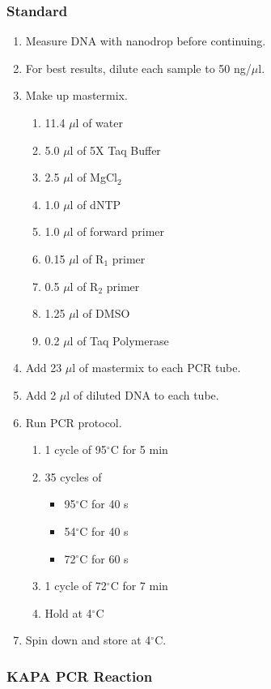 \subsubsection*{Standard}
\begin{enumerate}
\item Measure DNA with nanodrop before continuing\footnotemark.
\item For best results, dilute each sample to 50 ng/$\mu$l.
\item Make up mastermix.
  \begin{enumerate}
  \item 11.4 $\mu$l of water
  \item 5.0 $\mu$l of 5X Taq Buffer
  \item 2.5 $\mu$l of MgCl$_2$
  \item 1.0 $\mu$l of dNTP
  \item 1.0 $\mu$l of forward primer
  \item 0.15 $\mu$l of R$_1$ primer
  \item 0.5 $\mu$l of R$_2$ primer
  \item 1.25 $\mu$l of DMSO
  \item 0.2 $\mu$l of Taq Polymerase
  \end{enumerate}
\item Add 23 $\mu$l of mastermix to each PCR tube.
\item Add 2 $\mu$l of diluted DNA to each tube.
\item Run PCR protocol.
  \begin{enumerate}
  \item 1 cycle of 95$^{\circ}$C for 5 min
  \item 35 cycles of
    \begin{itemize}
    \item 95$^{\circ}$C for 40 s
    \item 54$^{\circ}$C for 40 s
    \item 72$^{\circ}$C for 60 s
    \end{itemize}
  \item 1 cycle of 72$^{\circ}$C for 7 min
  \item Hold at 4$^{\circ}$C
  \end{enumerate}
\item Spin down and store at 4$^{\circ}$C.
\end{enumerate}

\subsubsection*{KAPA PCR Reaction}

